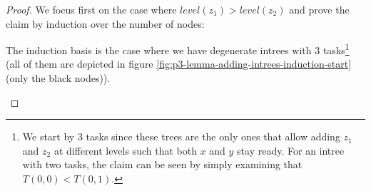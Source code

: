 \begin{proof}
  We focus first on the case where $level(z_1) > level(z_2)$ and prove the claim by induction over the number of nodes:
  
  The induction basis is the case where we have degenerate intrees with 3 tasks\footnote{We start by 3 tasks since these trees are the only ones that allow adding $z_1$ and $z_2$ at different levels such that both $x$ and $y$ stay ready. For an intree with two tasks, the claim can be seen by simply examining that $T(0,0)<T(0,1)$.} (all of them are depicted in figure \ref{fig:p3-lemma-adding-intrees-induction-start} (only the black nodes)).
  
  \begin{figure}[t]
    \centering
\end{figure}
\end{proof}

